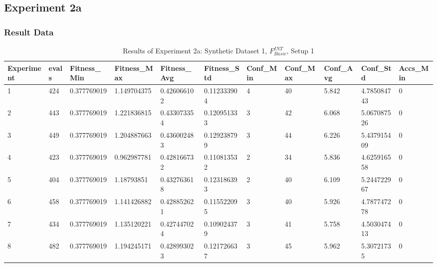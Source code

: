 	\subsection{Experiment 2a}
	\label{sec:A_Exp2a}
		\subsubsection{Result Data}
		\label{sec:A_Exp2a_Data}	
			\begin{table}[H]
			\caption{Results of Experiment 2a: Synthetic Dataset 1, $F_{Basic}^{INT}$, Setup 1}
			\label{tab:A_Exp2a_Data}
				\begin{adjustbox}{max width=380pt,keepaspectratio,angle=90}
					\begin{tabular}{|l|l|l|l|l|l|l|l|l|l|l|}
						\rowcolor[HTML]{EFEFEF} 
						\hline
						Experiment & evals & Fitness\_Min & Fitness\_Max & Fitness\_Avg & Fitness\_Std & Conf\_Min & Conf\_Max & Conf\_Avg & Conf\_Std   & Accs\_Min \\ \hline
						1          & 424   & 0.377769019  & 1.149704375  & 0.426066102  & 0.112333904  & 4         & 40        & 5.842     & 4.785084743 & 0         \\ \hline
						2          & 443   & 0.377769019  & 1.221836815  & 0.433073354  & 0.120951333  & 3         & 42        & 6.068     & 5.067087526 & 0         \\ \hline
						3          & 449   & 0.377769019  & 1.204887663  & 0.436002483  & 0.129238799  & 3         & 44        & 6.226     & 5.437915409 & 0         \\ \hline
						4          & 423   & 0.377769019  & 0.962987781  & 0.428166732  & 0.110813532  & 2         & 34        & 5.836     & 4.625916558 & 0         \\ \hline
						5          & 404   & 0.377769019  & 1.18793851   & 0.432763618  & 0.123186393  & 2         & 40        & 6.109     & 5.244722967 & 0         \\ \hline
						6          & 458   & 0.377769019  & 1.141426882  & 0.428852621  & 0.115522095  & 3         & 40        & 5.926     & 4.787747278 & 0         \\ \hline
						7          & 434   & 0.377769019  & 1.135120221  & 0.427447024  & 0.109024379  & 3         & 41        & 5.758     & 4.503047413 & 0         \\ \hline
						8          & 482   & 0.377769019  & 1.194245171  & 0.428993023  & 0.121726637  & 3         & 45        & 5.962     & 5.30721735  & 0         \\ \hline

\end{tabular}
\end{adjustbox}
\end{table}
